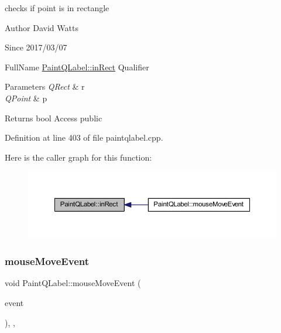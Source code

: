 checks if point is in rectangle

\begin{DoxyAuthor}{Author}
David Watts 
\end{DoxyAuthor}
\begin{DoxySince}{Since}
2017/03/07
\end{DoxySince}
Full\+Name \hyperlink{class_paint_q_label_aa01fed3a13d42241b4769d14290a85e6}{Paint\+Q\+Label\+::in\+Rect} Qualifier 
\begin{DoxyParams}{Parameters}
{\em Q\+Rect} & r \\
\hline
{\em Q\+Point} & p \\
\hline
\end{DoxyParams}
\begin{DoxyReturn}{Returns}
bool Access public 
\end{DoxyReturn}


Definition at line 403 of file paintqlabel.\+cpp.

Here is the caller graph for this function\+:
\nopagebreak
\begin{figure}[H]
\begin{center}
\leavevmode
\includegraphics[width=350pt]{class_paint_q_label_aa01fed3a13d42241b4769d14290a85e6_icgraph}
\end{center}
\end{figure}
\mbox{\label{class_paint_q_label_ae91b4ba28c7f30de7bfe0ece3011b8d6}} 
\subsubsection{\texorpdfstring{mouse\+Move\+Event}{mouseMoveEvent}}
{\footnotesize\ttfamily void Paint\+Q\+Label\+::mouse\+Move\+Event (\begin{DoxyParamCaption}\item[{Q\+Mouse\+Event $\ast$}]{event }\end{DoxyParamCaption})\hspace{0.3cm}{\ttfamily [protected]}, {\ttfamily [virtual]}, {\ttfamily [slot]}}

